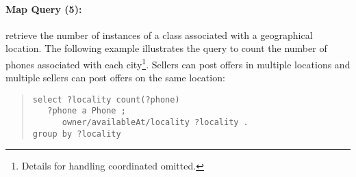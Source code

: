 \paragraph{Map Query (5):} retrieve the number of instances of a class associated with a geographical location.
The following example illustrates the query to count the number of phones associated with each city\footnote{Details for handling coordinated omitted.}. 
Sellers can post offers in multiple locations and multiple sellers can post offers on the same location:
\begin{quote}
{\footnotesize
\begin{verbatim}
select ?locality count(?phone)
   ?phone a Phone ; 
      owner/availableAt/locality ?locality .
group by ?locality
\end{verbatim}}
\end{quote}